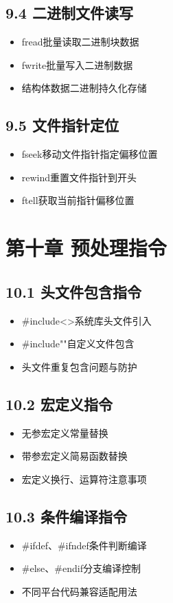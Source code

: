 \subsection{9.4 二进制文件读写}
\begin{itemize}
\item fread批量读取二进制块数据
\item fwrite批量写入二进制数据
\item 结构体数据二进制持久化存储
\end{itemize}

\subsection{9.5 文件指针定位}
\begin{itemize}
\item fseek移动文件指针指定偏移位置
\item rewind重置文件指针到开头
\item ftell获取当前指针偏移位置
\end{itemize}

\section{第十章 预处理指令}
\subsection{10.1 头文件包含指令}
\begin{itemize}
\item \#include<>系统库头文件引入
\item \#include""自定义文件包含
\item 头文件重复包含问题与防护
\end{itemize}

\subsection{10.2 宏定义指令}
\begin{itemize}
\item 无参宏定义常量替换
\item 带参宏定义简易函数替换
\item 宏定义换行、运算符注意事项
\end{itemize}

\subsection{10.3 条件编译指令}
\begin{itemize}
\item \#ifdef、\#ifndef条件判断编译
\item \#else、\#endif分支编译控制
\item 不同平台代码兼容适配用法
\end{itemize}

